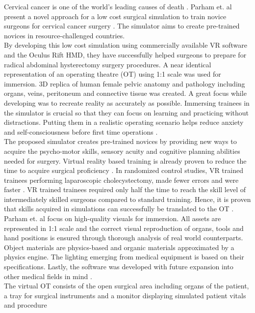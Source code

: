 Cervical cancer is one of the world’s leading causes of death \cite{Parham.2019}.
Parham et. al present a novel approach for a low cost surgical simulation to train novice
surgeons for cervical cancer surgery \cite{Parham.2019}. The simulator aims to create pre-trained novices
in resource-challenged countries. 
\\ By developing this low cost simulation using commercially available VR software and the
Oculus Rift HMD, they have successfully helped surgeons to prepare for radical abdominal
hysterectomy surgery procedures. A near identical representation of an operating theatre (OT)
using 1:1 scale was used for immersion. 3D replica of human female pelvic anatomy and
pathology including organs, veins, peritoneum and connective tissue was created. A
great focus while developing was to recreate reality as accurately as possible.
Immersing trainees in the simulator is crucial so that they can focus on learning and practicing without
distractions. Putting them in a realistic operating scenario helps reduce anxiety and
self-consciousness before first time operations \cite{Parham.2019}.
\\ The proposed simulator creates pre-trained novices by providing new ways to acquire the psycho-motor skills,
sensory acuity and cognitive planning abilities needed for surgery.
Virtual reality based training is already proven to reduce the time to acquire surgical proficiency
\cite{RN61,RN62}. In randomized control studies, VR trained trainees performing laparoscopic cholecystectomy, made fewer errors and were faster \cite{RN63,RN64}. VR trained trainees required only
half the time to reach the skill level of intermediately skilled surgeons compared to standard training.
Hence, it is proven that skills acquired in simulations can successfully be translated to the OT \cite{RN63,RN64}.
\\ Parham et. al focus on high-quality visuals for immersion. All assets are represented
in 1:1 scale and the correct visual reproduction of organs, tools and hand positions is
ensured through thorough analysis of real world counterparts. Object materials are
physics-based and organic materials approximated by a physics engine. The lighting
emerging from medical equipment is based on their specifications. Lastly, the software
was developed with future expansion into other medical fields in mind \cite{Parham.2019}.
\\ The virtual OT consists of the open surgical area including organs of the patient, a tray
for surgical instruments and a monitor displaying simulated patient vitals and procedure
